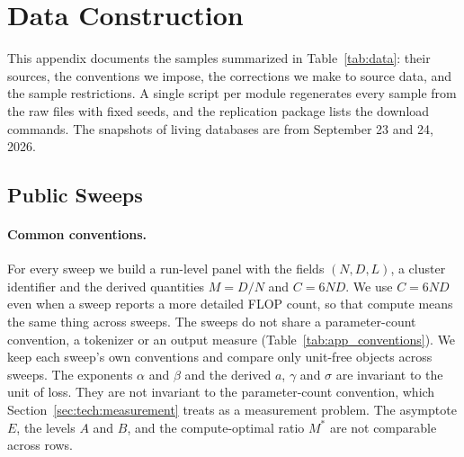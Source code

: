 \section{Data Construction}\label{app:data}


This appendix documents the samples summarized in Table~\ref{tab:data}: their sources, the conventions we impose,
the corrections we make to source data, and the sample restrictions. A single script per module regenerates every
sample from the raw files with fixed seeds, and the replication package lists the download commands. The snapshots of
living databases are from September 23 and 24, 2026.

\subsection{Public Sweeps}\label{app:sweeps}

\paragraph{Common conventions.}
For every sweep we build a run-level panel with the fields $(N,D,L)$, a cluster identifier and the derived
quantities $M=D/N$ and $C=6ND$. We use $C=6ND$ even when a sweep reports a more detailed FLOP count, so that compute
means the same thing across sweeps. The sweeps do not share a parameter-count convention, a tokenizer or an output
measure (Table~\ref{tab:app_conventions}). We keep each sweep's own conventions and compare only unit-free objects
across sweeps. The exponents $\alpha$ and $\beta$ and the derived $a$, $\gamma$ and $\sigma$ are invariant to the unit
of loss. They are not invariant to the parameter-count convention, which Section~\ref{sec:tech:measurement} treats as a
measurement problem. The asymptote $E$, the levels $A$ and $B$, and the compute-optimal ratio $M^{*}$ are not
comparable across rows.



